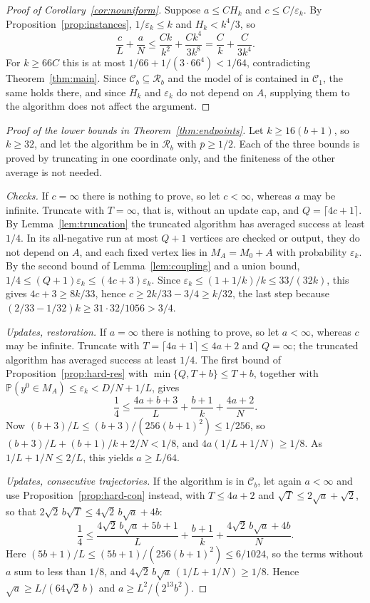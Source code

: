 \documentclass{amsart}
\theoremstyle{plain}
\theoremstyle{definition}
\theoremstyle{remark}
\renewcommand{\Pr}{\mathbb{P}}
\newcommand{\eps}{\varepsilon}
\newcommand{\res}{\mathcal{R}}
\newcommand{\con}{\mathcal{C}}
\begin{document}
\begin{proof}[Proof of Corollary~\ref{cor:nouniform}]
Suppose $a\le CH_k$ and $c\le C/\eps_k$. By Proposition~\ref{prop:instances}, $1/\eps_k\le k$ and $H_k<k^4/3$, so
\[
\frac cL+\frac aN\le\frac{Ck}{k^2}+\frac{Ck^4}{3k^8}=\frac Ck+\frac{C}{3k^4}.
\]
For $k\ge 66C$ this is at most $1/66+1/(3\cdot 66^4)<1/64$, contradicting Theorem~\ref{thm:main}. Since $\con_b\subseteq\res_b$ and the model of \cite{AC} is contained in $\con_1$, the same holds there, and since $H_k$ and $\eps_k$ do not depend on $A$, supplying them to the algorithm does not affect the argument.
\end{proof}

\begin{proof}[Proof of the lower bounds in Theorem~\ref{thm:endpoints}]
Let $k\ge 16(b+1)$, so $k\ge 32$, and let the algorithm be in $\res_b$ with $\bar p\ge 1/2$. Each of the three bounds is proved by truncating in one coordinate only, and the finiteness of the other average is not needed.

\emph{Checks.} If $c=\infty$ there is nothing to prove, so let $c<\infty$, whereas $a$ may be infinite. Truncate with $T=\infty$, that is, without an update cap, and $Q=\lceil 4c+1\rceil$. By Lemma~\ref{lem:truncation} the truncated algorithm has averaged success at least $1/4$. In its all-negative run at most $Q+1$ vertices are checked or output, they do not depend on $A$, and each fixed vertex lies in $M_A=M_0+A$ with probability $\eps_k$. By the second bound of Lemma~\ref{lem:coupling} and a union bound, $1/4\le(Q+1)\eps_k\le(4c+3)\eps_k$. Since $\eps_k\le(1+1/k)/k\le 33/(32k)$, this gives $4c+3\ge 8k/33$, hence $c\ge 2k/33-3/4\ge k/32$, the last step because $(2/33-1/32)k\ge 31\cdot 32/1056>3/4$.

\emph{Updates, restoration.} If $a=\infty$ there is nothing to prove, so let $a<\infty$, whereas $c$ may be infinite. Truncate with $T=\lceil 4a+1\rceil\le 4a+2$ and $Q=\infty$; the truncated algorithm has averaged success at least $1/4$. The first bound of Proposition~\ref{prop:hard-res} with $\min\{Q,T+b\}\le T+b$, together with $\Pr(y^0\in M_A)\le\eps_k<D/N+1/L$, gives
\[
\frac14\le\frac{4a+b+3}{L}+\frac{b+1}{k}+\frac{4a+2}{N}.
\]
Now $(b+3)/L\le(b+3)/(256(b+1)^2)\le 1/256$, so $(b+3)/L+(b+1)/k+2/N<1/8$, and $4a(1/L+1/N)\ge 1/8$. As $1/L+1/N\le 2/L$, this yields $a\ge L/64$.

\emph{Updates, consecutive trajectories.} If the algorithm is in $\con_b$, let again $a<\infty$ and use Proposition~\ref{prop:hard-con} instead, with $T\le 4a+2$ and $\sqrt T\le 2\sqrt a+\sqrt 2$, so that $2\sqrt2\,b\sqrt T\le 4\sqrt2\,b\sqrt a+4b$:
\[
\frac14\le\frac{4\sqrt2\,b\sqrt a+5b+1}{L}+\frac{b+1}{k}+\frac{4\sqrt2\,b\sqrt a+4b}{N}.
\]
Here $(5b+1)/L\le(5b+1)/(256(b+1)^2)\le 6/1024$, so the terms without $a$ sum to less than $1/8$, and $4\sqrt2\,b\sqrt a\,(1/L+1/N)\ge 1/8$. Hence $\sqrt a\ge L/(64\sqrt2\,b)$ and $a\ge L^2/(2^{13}b^2)$.
\end{proof}
\end{document}
